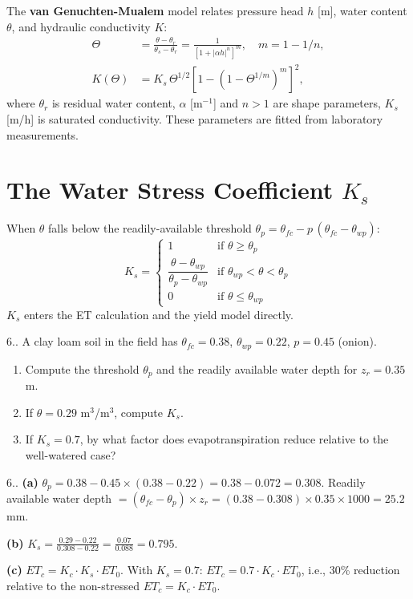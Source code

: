 \documentclass[12pt,a4paper,openany]{book}
\newcounter{exoctr}[chapter]
\renewcommand{\theexoctr}{\thechapter.\arabic{exoctr}}
\begin{document}
The \textbf{van Genuchten-Mualem} model relates pressure head $h$ [m], water content $\theta$, and hydraulic conductivity $K$:
\begin{align}
  \Theta &= \frac{\theta-\theta_r}{\theta_s-\theta_r} = \frac{1}{[1+|\alpha h|^n]^m},\quad m=1-1/n,\\
  K(\Theta) &= K_s\,\Theta^{1/2}[1-(1-\Theta^{1/m})^m]^2,
\end{align}
where $\theta_r$ is residual water content, $\alpha$ [m$^{-1}$] and $n>1$ are shape parameters, $K_s$ [m/h] is saturated conductivity. These parameters are fitted from laboratory measurements.

\section{The Water Stress Coefficient $K_s$}

When $\theta$ falls below the readily-available threshold $\theta_p=\theta_{fc}-p\,(\theta_{fc}-\theta_{wp})$:
\begin{equation}
  K_s = \begin{cases}1&\text{if }\theta\geq\theta_p\\\dfrac{\theta-\theta_{wp}}{\theta_p-\theta_{wp}}&\text{if }\theta_{wp}<\theta<\theta_p\\0&\text{if }\theta\leq\theta_{wp}\end{cases}
\end{equation}
$K_s$ enters the ET calculation and the yield model directly.

\begin{exobox}{6.\theexoctr}
A clay loam soil in the field has $\theta_{fc}=0.38$, $\theta_{wp}=0.22$, $p=0.45$ (onion). 
\begin{enumerate}[label=(\alph*)]
  \item Compute the threshold $\theta_p$ and the readily available water depth for $z_r=0.35$ m.
  \item If $\theta=0.29$ m$^3$/m$^3$, compute $K_s$.
  \item If $K_s=0.7$, by what factor does evapotranspiration reduce relative to the well-watered case?
\end{enumerate}
\end{exobox}

\begin{solbox}{6.\theexoctr}
\textbf{(a)} $\theta_p=0.38-0.45\times(0.38-0.22)=0.38-0.072=0.308$. 
Readily available water depth $= (\theta_{fc}-\theta_p)\times z_r=(0.38-0.308)\times0.35\times1000=25.2$ mm.

\textbf{(b)} $K_s=\frac{0.29-0.22}{0.308-0.22}=\frac{0.07}{0.088}=0.795$.

\textbf{(c)} $ET_c=K_c\cdot K_s\cdot ET_0$. With $K_s=0.7$: $ET_c=0.7\cdot K_c\cdot ET_0$, i.e., 30\% reduction relative to the non-stressed $ET_c=K_c\cdot ET_0$.
\end{solbox}
\end{document}

